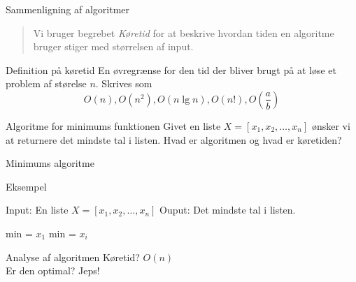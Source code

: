 \documentclass[12pt,t]{beamer}
\begin{document}
    \begin{frame}[t]{Sammenligning af algoritmer}
        \begin{quote}
            Vi bruger begrebet \emph{Køretid} for at beskrive hvordan tiden en
            algoritme bruger stiger med størrelsen af input.
        \end{quote}
        \pause
        \vspace{-1em}
        \begin{block}{Definition på køretid}
            En øvregrænse for den tid der bliver brugt på at løse et problem af
            størelse $n$. Skrives som
            $$
                O(n), O(n^2), O(n \lg n), O(n!), O\left( \frac{a}{b} \right)
            $$
        \end{block}
        \pause
        \begin{exampleblock}{Algoritme for minimums funktionen}
            Givet en liste $X = [x_1,x_2,\dots,x_n]$ ønsker vi at returnere det
            mindste tal i listen. Hvad er algoritmen og hvad er køretiden?
        \end{exampleblock}
    \end{frame}

    \begin{frame}{Minimums algoritme}
        \begin{block}{Eksempel}
        \vspace{-1.5em}
        \begin{algorithm}[H]
            \caption{\newline Input: En liste $X=[x_1,x_2, \dots, x_n]$
                     \newline Ouput: Det mindste tal i listen.
            }
            \begin{algorithmic}
                \State min = $x_1$
                        \State min = $x_i$
                    \EndIf
                \EndFor
            \end{algorithmic}
        \end{algorithm}
        \end{block}
        \pause
        \begin{block}{Analyse af algoritmen}
            \centering Køretid? \pause $O(n)$ \\
            \pause
            \centering Er den optimal? \pause \alert{Jeps!}
        \end{block}
    \end{frame}
\end{document}
